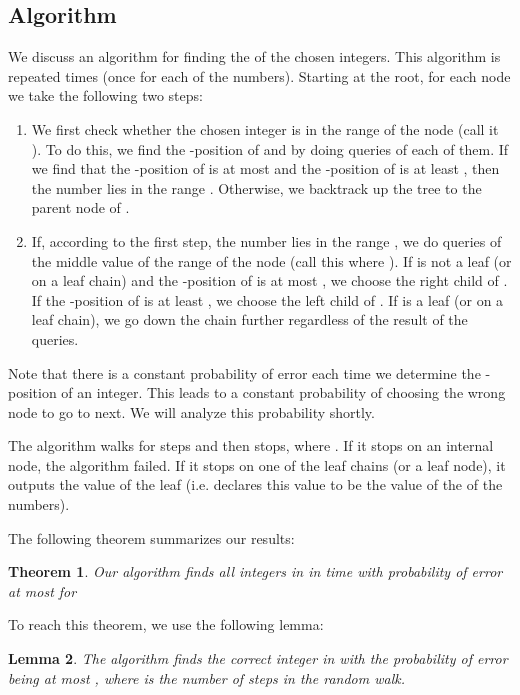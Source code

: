 \documentclass[12pt]{article}
\newtheorem{theorem}{Theorem}
\newtheorem{lemma}[theorem]{Lemma}
\begin{document}
\subsection{Algorithm} \label{subsec:algdetails}

We discuss an algorithm for finding the  of the  chosen integers. This algorithm is repeated  times (once for each of the  numbers). Starting at the root, for each node  we take the following two steps:
\begin{enumerate}
	\item We first check whether the  chosen integer is in the range of the node (call it ). To do this, we find the -position of  and  by doing  queries of each of them. If we find that the -position of  is at most  and the -position of  is at least , then the  number lies in the range . Otherwise, we backtrack up the tree to the parent node of  . 
	\item If, according to the first step, the  number lies in the range , we do  queries of the middle value of the range of the node (call this  where ). If  is not a leaf (or on a leaf chain) and the -position of  is at most , we choose the right child of . If the -position of  is at least , we choose the left child of . If  is a leaf (or on a leaf chain), we go down the chain further regardless of the result of the queries. 
\end{enumerate}

Note that there is a constant probability of error each time we determine the -position of an integer. This leads to a constant probability of choosing the wrong node to go to next. We will analyze this probability shortly. 

The algorithm walks for  steps and then stops, where . If it stops on an internal node, the algorithm failed. If it stops on one of the leaf chains (or a leaf node), it outputs the value of the leaf (i.e. declares this value to be the value of the  of the  numbers). 

The following theorem summarizes our results:

\begin{theorem} \label{thm:algrunningtime}
Our algorithm finds all  integers in  in  time with probability of error at most  for 
\end{theorem}

To reach this theorem, we use the following lemma:

\begin{lemma} \label{lem:algcorrectness}
The algorithm finds the correct  integer in  with the probability of error being at most , where  is the number of steps in the random walk.
\end{lemma}
\end{document}

